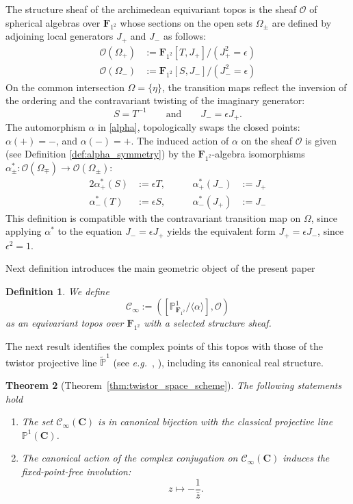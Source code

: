 \documentclass[11pt,a4paper]{article}
\let\mathscr\mathscr
\newtheorem{theorem}{Theorem}[section]
\newtheorem{definition}[theorem]{Definition}
\newcommand{\C}{\mathbf{C}}
\renewcommand{\P}{\mathbb{P}}
\newcommand{\cO}{\mathcal O}
\newcommand{\Ftwo}{\mathbf{F}_{1^2}}
\newcommand{\minf}{\mathscr C_\infty}
\newcommand{\natgi}{[\P^1_{\Ftwo}/\langle\alpha\rangle]}
\def\eg{{\it e.g.\/}\ }
\begin{document}
The structure sheaf of the archimedean   equivariant topos   is the sheaf $\cO$ of spherical algebras over $\Ftwo$ whose sections on the open sets $\Omega_\pm$ are defined by adjoining local generators $J_+$ and $J_-$  as follows:
\begin{equation*}
\begin{aligned}
\mathcal{O}(\Omega_+) &:= \Ftwo[T, J_+] \big/ (J_+^2 = \epsilon) \\
\mathcal{O}(\Omega_-) &:= \Ftwo[S, J_-] \big/ (J_-^2 = \epsilon)
\end{aligned}
\end{equation*}
On the common intersection $\Omega = \{\eta\}$, the transition maps reflect the inversion of the ordering and the contravariant twisting of the imaginary generator:
\begin{equation}\label{eq:transition_maps}
S = T^{-1} \qquad \text{and} \qquad J_- = \epsilon J_+.
\end{equation}
The   automorphism $\alpha$  in \eqref{alpha}, topologically swaps the closed points: $\alpha(+) = -$, and $\alpha(-) = +$. The induced  action of $\alpha$ on the  sheaf $\cO$  is given (see Definition \ref{def:alpha_symmetry})  by the $\Ftwo$-algebra isomorphisms $\alpha^*_{\pm}: \mathcal{O}(\Omega_\mp) \to \mathcal{O}(\Omega_\pm)$:
\begin{alignat*}{2}
\alpha^*_+(S) &:= \epsilon T, &\qquad \alpha^*_+(J_-) &:= J_+
\\
\alpha^*_-(T) &:= \epsilon S, &\qquad \alpha^*_-(J_+) &:= J_-
\end{alignat*}
This definition is  compatible with the contravariant transition map on $\Omega$, since applying $\alpha^*$ to the equation $J_- = \epsilon J_+$ yields the equivalent form $J_+ = \epsilon J_-$,  since $\epsilon^2 = 1$.\vspace{.05in}

Next definition introduces the main geometric object of the present
paper


\begin{definition}\label{local}
We define
\[
\minf:= (\natgi, \cO)
\]
as an equivariant topos over $\Ftwo$ with a selected structure sheaf.  
\end{definition}

The next result identifies the complex points of this topos with those of the twistor projective line $\widetilde{\P}^1$ (see \eg \cite{Si}, \cite{S}), including its canonical real structure.




\begin{theorem}[Theorem~\ref{thm:twistor_space_scheme}] The following statements hold
\begin{enumerate}
    \item The set $\minf(\C)$ is in canonical bijection  with the classical projective line $\P^1(\C)$.
    \item The canonical action of the complex conjugation  on  $\minf(\C)$ induces  the fixed-point-free involution:
\begin{equation*}
z \longmapsto -\frac{1}{\bar{z}}.
\end{equation*}
\end{enumerate}
\end{theorem}
\end{document}
